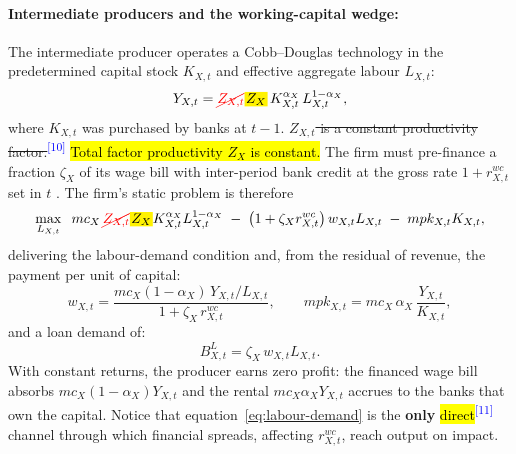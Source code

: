 \documentclass[11pt]{article}
\newcommand{\A}[1]{\hl{#1}}
\newcommand{\D}[1]{{\color{red}\st{#1}}}
\newcommand{\Am}[1]{\mathchoice
  {{\setlength{\fboxsep}{1pt}\colorbox{yellow}{$\displaystyle #1$}}}
  {{\setlength{\fboxsep}{1pt}\colorbox{yellow}{$\textstyle #1$}}}
  {{\setlength{\fboxsep}{1pt}\colorbox{yellow}{$\scriptstyle #1$}}}
  {{\setlength{\fboxsep}{1pt}\colorbox{yellow}{$\scriptscriptstyle #1$}}}}
\newcommand{\Dm}[1]{{\color{red}\cancel{#1}}}
\newcommand{\chg}[1]{\textsuperscript{\textcolor{blue}{\scriptsize[#1]}}}
\begin{document}
\paragraph{Intermediate producers and the working-capital wedge:}
\label{sec:wc}
The intermediate producer operates a Cobb--Douglas technology in the predetermined capital stock $K_{X,t}$ and effective aggregate labour $L_{X,t}$:
\begin{equation}
Y_{X,t}=\Dm{Z_{X,t}}\Am{Z_X}\,K_{X,t}^{\alpha_X}\,L_{X,t}^{1-\alpha_X},
\label{eq:production}
\end{equation}
where $K_{X,t}$ was purchased by banks at $t-1$. \D{$Z_{X,t}$ is a constant productivity factor.}\chg{10} \A{Total factor productivity $Z_X$ is constant.} The firm must pre-finance a fraction $\zeta_X$ of its wage bill with inter-period bank credit at the gross rate $1+r^{wc}_{X,t}$ set in $t$ \citep{neumeyer2005business}. The firm's static problem is therefore
\begin{equation}
\max_{L_{X,t}}\;\;
mc_X\,\Dm{Z_{X,t}}\Am{Z_X}K_{X,t}^{\alpha_X}L_{X,t}^{1-\alpha_X}
\;-\;\bigl(1+\zeta_X r^{wc}_{X,t}\bigr)\,w_{X,t}L_{X,t}
\;-\;mpk_{X,t}K_{X,t},
\label{eq:firm-problem}
\end{equation}
delivering the labour-demand condition and, from the residual of revenue, the payment per unit of capital:
\begin{equation}
w_{X,t}=\frac{mc_X(1-\alpha_X)\,Y_{X,t}/L_{X,t}}{1+\zeta_X\,r^{wc}_{X,t}},
\qquad
mpk_{X,t}=mc_X\,\alpha_X\,\frac{Y_{X,t}}{K_{X,t}},
\label{eq:labour-demand}
\end{equation}
and a loan demand of:
\begin{equation}
B_{X,t}^L=\zeta_X\,w_{X,t}L_{X,t}.
\label{eq:loan-demand}
\end{equation}
With constant returns, the producer earns zero profit: the financed wage bill absorbs $mc_X(1-\alpha_X)Y_{X,t}$ and the rental $mc_X\alpha_X Y_{X,t}$ accrues to the banks that own the capital. Notice that equation~\eqref{eq:labour-demand} is the \textbf{only} \A{direct}\chg{11} channel through which financial spreads, affecting $r^{wc}_{X,t}$, reach output on impact.
\end{document}

